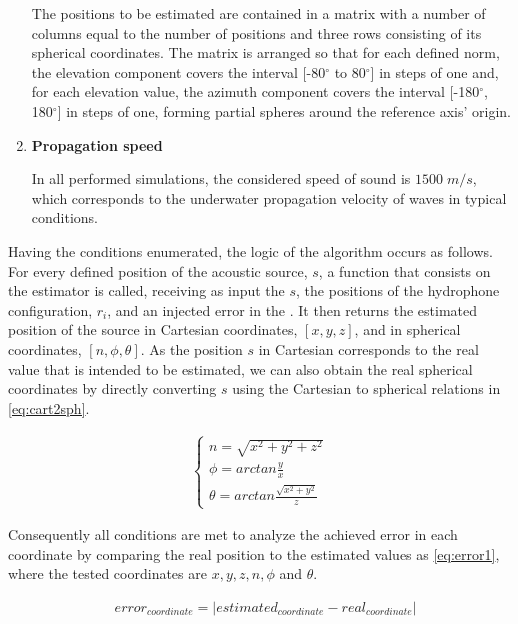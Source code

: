 \begin{enumerate}[label=\alph*)]
	 The positions to be estimated are contained in a matrix with a number of columns equal to the number of positions and three rows consisting of its spherical coordinates. The matrix is arranged so that for each defined norm, the elevation component covers the interval [-80$^{\circ}$ to 80$^{\circ}$] in steps of one and, for each elevation value, the azimuth component covers the interval [-180$^{\circ}$, 180$^{\circ}$] in steps of one, forming partial spheres around the reference axis' origin.

	\item \textbf{Propagation speed}
	
	In all performed simulations, the considered speed of sound is $1500 \; m/s$, which corresponds to the underwater propagation velocity of waves in typical conditions.
	
\end{enumerate}

Having the conditions enumerated, the logic of the algorithm occurs as follows. For every defined position of the acoustic source, $s$, a function that consists on the estimator is called, receiving as input the $s$, the positions of the hydrophone configuration, $r_i$, and an injected error in the . It then returns the estimated position of the source in Cartesian coordinates, $[x,y,z]$, and in spherical coordinates, $[n, \phi, \theta]$. As the position $s$ in Cartesian corresponds to the real value that is intended to be estimated, we can also obtain the real spherical coordinates by directly converting $s$ using the Cartesian to spherical relations in \ref{eq:cart2sph}.

\begin{eqnarray}
\begin{cases} 
n =  \sqrt{x^2 + y^2 + z^2}\\ 
\phi  = arctan \frac{y}{x}\\ 
\theta =  arctan \frac{\sqrt{x^2+y^2}}{z}
\end{cases}
\label{eq:cart2sph}
\end{eqnarray}

Consequently all conditions are met to analyze the achieved error in each coordinate by comparing the real position to the estimated values as \ref{eq:error1}, where the tested coordinates are $x, y, z, n, \phi$ and $\theta$.

\begin{eqnarray}
&error_{coordinate} = |estimated_{coordinate} - real_{coordinate}|
\label{eq:error1}
\end{eqnarray}

